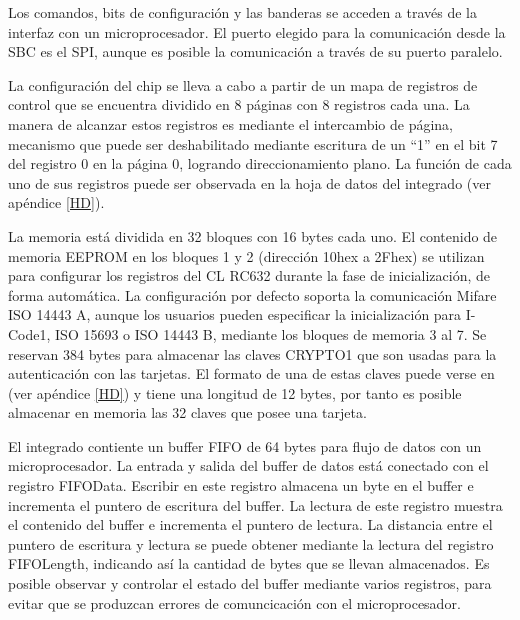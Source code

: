 \newpage
{}

Los comandos, bits de configuración y las banderas se acceden a través de la interfaz con un microprocesador. El puerto elegido para la comunicación desde la SBC es el SPI, aunque es posible la comunicación a través de su puerto paralelo. 

\bigskip
{}\label{Registros}

La configuración del chip se lleva a cabo a partir de un mapa de registros de control que se encuentra dividido en 8 páginas con 8 registros cada una. La manera de alcanzar estos registros es mediante el intercambio de página, mecanismo que puede ser deshabilitado mediante escritura de un “1” en el bit 7 del registro 0 en la página 0, logrando direccionamiento plano. La función de cada uno de sus registros puede ser observada en la hoja de datos del integrado \cite{RC632} (ver apéndice \ref{HD}).

\bigskip
{}

La memoria está dividida en 32 bloques con 16 bytes cada uno.
El contenido de memoria EEPROM en los bloques 1 y 2 (dirección 10hex a 2Fhex) se utilizan para configurar los registros del CL RC632 durante la fase de inicialización, de forma automática.
La configuración por defecto soporta la comunicación Mifare ISO 14443 A, aunque los usuarios pueden especificar la inicialización para I-Code1, ISO 15693 o ISO 14443 B, mediante los bloques de memoria 3 al 7.
Se reservan 384 bytes para almacenar las claves CRYPTO1 que son usadas para la autenticación con las tarjetas. El formato de una de estas claves puede verse en \cite{RC632} (ver apéndice \ref{HD}) y tiene una longitud de 12 bytes, por tanto es posible almacenar en memoria las 32 claves que posee una tarjeta.

\bigskip
{}

El integrado contiente un buffer FIFO de 64 bytes para flujo de datos con un microprocesador.
La entrada y salida del buffer de datos está conectado con el registro FIFOData. Escribir en este registro almacena un byte en el buffer e incrementa el puntero de escritura del buffer. La lectura de este registro muestra el contenido del buffer e incrementa el puntero de lectura. La distancia entre el puntero de escritura y lectura se puede obtener mediante la lectura del registro FIFOLength, indicando así la cantidad de bytes que se llevan almacenados. Es posible observar y controlar el estado del buffer mediante varios registros, para evitar que se produzcan errores de comuncicación con el microprocesador.

